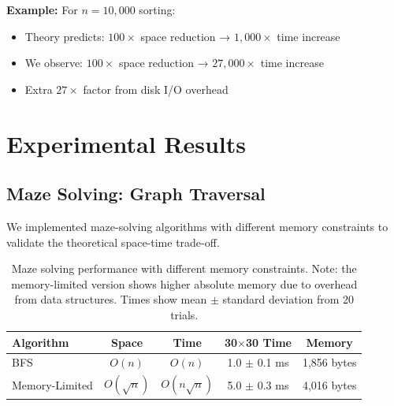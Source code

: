 \documentclass[11pt]{article}
\theoremstyle{definition}
\begin{document}
\textbf{Example:} For $n = 10,000$ sorting:
\begin{itemize}
\item Theory predicts: $100\times$ space reduction → $1,000\times$ time increase
\item We observe: $100\times$ space reduction → $27,000\times$ time increase
\item Extra $27\times$ factor from disk I/O overhead
\end{itemize}

\section{Experimental Results}
\label{sec:experiments}

\subsection{Maze Solving: Graph Traversal}

We implemented maze-solving algorithms with different memory constraints to validate the theoretical space-time trade-off.

\begin{table}[ht]
\centering
\begin{tabular}{lcccc}
\toprule
Algorithm & Space & Time & 30$\times$30 Time & Memory \\
\midrule
BFS & $O(n)$ & $O(n)$ & 1.0 $\pm$ 0.1 ms & 1,856 bytes \\
Memory-Limited & $O(\sqrt{n})$ & $O(n\sqrt{n})$ & 5.0 $\pm$ 0.3 ms & 4,016 bytes \\
\bottomrule
\end{tabular}
\caption{Maze solving performance with different memory constraints. Note: the memory-limited version shows higher absolute memory due to overhead from data structures. Times show mean $\pm$ standard deviation from 20 trials.}
\label{tab:maze}
\end{table}
\end{document}
